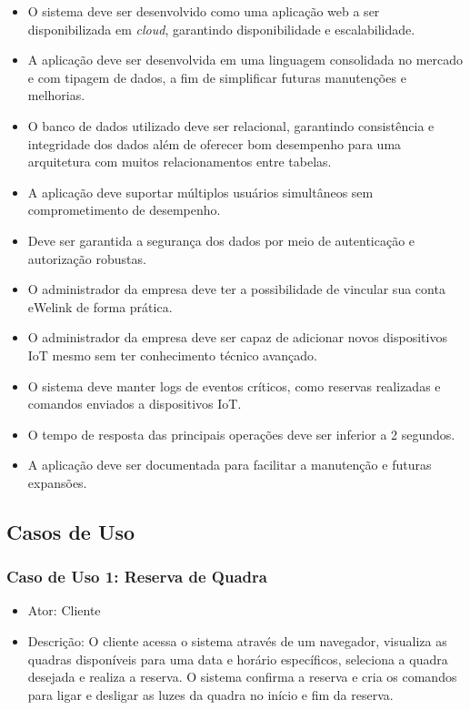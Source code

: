 \begin{itemize}
     \item O sistema deve ser desenvolvido como uma aplicação web a ser disponibilizada em \textit{cloud}, garantindo disponibilidade e escalabilidade.
     \item A aplicação deve ser desenvolvida em uma linguagem consolidada no mercado e com tipagem de dados, a fim de simplificar futuras manutenções e melhorias.
     \item O banco de dados utilizado deve ser relacional, garantindo consistência e integridade dos dados além de oferecer bom desempenho para uma arquitetura com muitos relacionamentos entre tabelas.
     \item A aplicação deve suportar múltiplos usuários simultâneos sem comprometimento de desempenho.
     \item Deve ser garantida a segurança dos dados por meio de autenticação e autorização robustas.
     \item O administrador da empresa deve ter a possibilidade de vincular sua conta eWelink de forma prática.
     \item O administrador da empresa deve ser capaz de adicionar novos dispositivos IoT mesmo sem ter conhecimento técnico avançado.
     \item O sistema deve manter logs de eventos críticos, como reservas realizadas e comandos enviados a dispositivos IoT.
     \item O tempo de resposta das principais operações deve ser inferior a 2 segundos.
     \item A aplicação deve ser documentada para facilitar a manutenção e futuras expansões.
\end{itemize}


\subsection{Casos de Uso}\label{subsec:casos_de_uso}

\subsubsection*{Caso de Uso 1: Reserva de Quadra}
\begin{itemize}
     \item Ator: Cliente
     \item Descrição: O cliente acessa o sistema através de um navegador, visualiza as quadras disponíveis para uma data e horário específicos, seleciona a quadra desejada e realiza a reserva. O sistema confirma a reserva e cria os comandos para ligar e desligar as luzes da quadra no início e fim da reserva.
\end{itemize}


